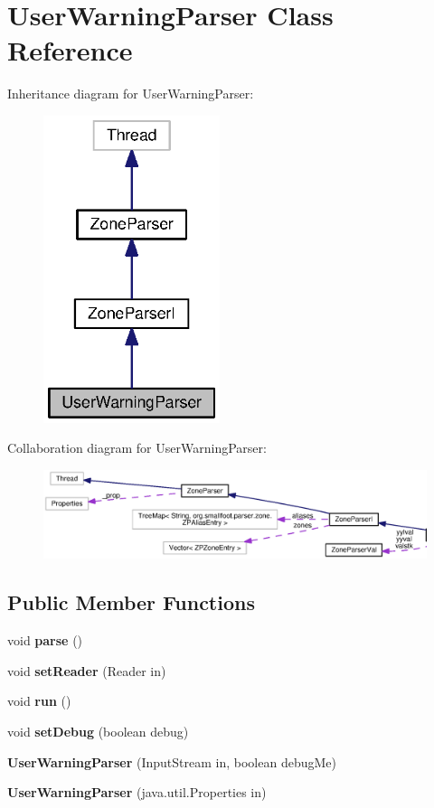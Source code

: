 \section{User\+Warning\+Parser Class Reference}
\label{classorg_1_1smallfoot_1_1parser_1_1zone_1_1UserWarningParser}


Inheritance diagram for User\+Warning\+Parser\+:
\nopagebreak
\begin{figure}[H]
\begin{center}
\leavevmode
\includegraphics[width=146pt]{classorg_1_1smallfoot_1_1parser_1_1zone_1_1UserWarningParser__inherit__graph}
\end{center}
\end{figure}


Collaboration diagram for User\+Warning\+Parser\+:
\nopagebreak
\begin{figure}[H]
\begin{center}
\leavevmode
\includegraphics[width=350pt]{classorg_1_1smallfoot_1_1parser_1_1zone_1_1UserWarningParser__coll__graph}
\end{center}
\end{figure}
\subsection*{Public Member Functions}
\begin{DoxyCompactItemize}
\item 
void {\bf parse} ()
\item 
void {\bf set\+Reader} (Reader in)
\item 
void {\bf run} ()
\item 
void {\bf set\+Debug} (boolean debug)
\item 
{\bf User\+Warning\+Parser} (Input\+Stream in, boolean debug\+Me)
\item 
{\bf User\+Warning\+Parser} (java.\+util.\+Properties in)
\end{DoxyCompactItemize}
